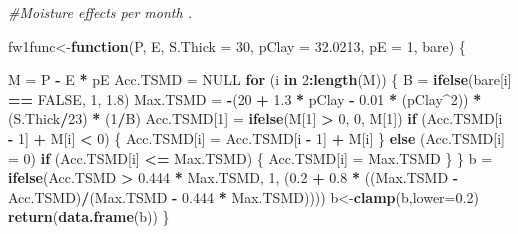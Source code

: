\documentclass[
  10pt,
  b5paper,
]{book}
\newenvironment{Shaded}{\begin{snugshade}}{\end{snugshade}}
\newcommand{\CommentTok}[1]{\textcolor[rgb]{0.56,0.35,0.01}{\textit{#1}}}
\newcommand{\ControlFlowTok}[1]{\textcolor[rgb]{0.13,0.29,0.53}{\textbf{#1}}}
\newcommand{\DataTypeTok}[1]{\textcolor[rgb]{0.13,0.29,0.53}{#1}}
\newcommand{\DecValTok}[1]{\textcolor[rgb]{0.00,0.00,0.81}{#1}}
\newcommand{\FloatTok}[1]{\textcolor[rgb]{0.00,0.00,0.81}{#1}}
\newcommand{\KeywordTok}[1]{\textcolor[rgb]{0.13,0.29,0.53}{\textbf{#1}}}
\newcommand{\NormalTok}[1]{#1}
\newcommand{\OperatorTok}[1]{\textcolor[rgb]{0.81,0.36,0.00}{\textbf{#1}}}
\newcommand{\OtherTok}[1]{\textcolor[rgb]{0.56,0.35,0.01}{#1}}
\newcommand{\StringTok}[1]{\textcolor[rgb]{0.31,0.60,0.02}{#1}}
\begin{document}
\begin{Shaded}
\begin{Highlighting}[]
\CommentTok{#Moisture effects per month . }

\NormalTok{fw1func<-}\ControlFlowTok{function}\NormalTok{(P, E, }\DataTypeTok{S.Thick =} \DecValTok{30}\NormalTok{, }\DataTypeTok{pClay =} \FloatTok{32.0213}\NormalTok{, }\DataTypeTok{pE =} \DecValTok{1}\NormalTok{, bare) }
\NormalTok{\{}
   
\NormalTok{    M =}\StringTok{ }\NormalTok{P }\OperatorTok{-}\StringTok{ }\NormalTok{E }\OperatorTok{*}\StringTok{ }\NormalTok{pE}
\NormalTok{    Acc.TSMD =}\StringTok{ }\OtherTok{NULL}
    \ControlFlowTok{for}\NormalTok{ (i }\ControlFlowTok{in} \DecValTok{2}\OperatorTok{:}\KeywordTok{length}\NormalTok{(M)) \{}
\NormalTok{ 	B =}\StringTok{ }\KeywordTok{ifelse}\NormalTok{(bare[i] }\OperatorTok{==}\StringTok{ }\OtherTok{FALSE}\NormalTok{, }\DecValTok{1}\NormalTok{, }\FloatTok{1.8}\NormalTok{)}
\NormalTok{	 Max.TSMD =}\StringTok{ }\OperatorTok{-}\NormalTok{(}\DecValTok{20} \OperatorTok{+}\StringTok{ }\FloatTok{1.3} \OperatorTok{*}\StringTok{ }\NormalTok{pClay }\OperatorTok{-}\StringTok{ }\FloatTok{0.01} \OperatorTok{*}\StringTok{ }\NormalTok{(pClay}\OperatorTok{^}\DecValTok{2}\NormalTok{)) }\OperatorTok{*}\StringTok{ }\NormalTok{(S.Thick}\OperatorTok{/}\DecValTok{23}\NormalTok{) }\OperatorTok{*}\StringTok{ }\NormalTok{(}\DecValTok{1}\OperatorTok{/}\NormalTok{B)}
\NormalTok{        Acc.TSMD[}\DecValTok{1}\NormalTok{] =}\StringTok{ }\KeywordTok{ifelse}\NormalTok{(M[}\DecValTok{1}\NormalTok{] }\OperatorTok{>}\StringTok{ }\DecValTok{0}\NormalTok{, }\DecValTok{0}\NormalTok{, M[}\DecValTok{1}\NormalTok{])}
        \ControlFlowTok{if}\NormalTok{ (Acc.TSMD[i }\OperatorTok{-}\StringTok{ }\DecValTok{1}\NormalTok{] }\OperatorTok{+}\StringTok{ }\NormalTok{M[i] }\OperatorTok{<}\StringTok{ }\DecValTok{0}\NormalTok{) \{}
\NormalTok{            Acc.TSMD[i] =}\StringTok{ }\NormalTok{Acc.TSMD[i }\OperatorTok{-}\StringTok{ }\DecValTok{1}\NormalTok{] }\OperatorTok{+}\StringTok{ }\NormalTok{M[i]}
\NormalTok{        \}}
        \ControlFlowTok{else}\NormalTok{ (Acc.TSMD[i] =}\StringTok{ }\DecValTok{0}\NormalTok{)}
        \ControlFlowTok{if}\NormalTok{ (Acc.TSMD[i] }\OperatorTok{<=}\StringTok{ }\NormalTok{Max.TSMD) \{}
\NormalTok{            Acc.TSMD[i] =}\StringTok{ }\NormalTok{Max.TSMD}
\NormalTok{        \}}
\NormalTok{    \}}
\NormalTok{    b =}\StringTok{ }\KeywordTok{ifelse}\NormalTok{(Acc.TSMD }\OperatorTok{>}\StringTok{ }\FloatTok{0.444} \OperatorTok{*}\StringTok{ }\NormalTok{Max.TSMD, }\DecValTok{1}\NormalTok{, (}\FloatTok{0.2} \OperatorTok{+}\StringTok{ }\FloatTok{0.8} \OperatorTok{*}\StringTok{ }\NormalTok{((Max.TSMD }\OperatorTok{-}\StringTok{ }
\StringTok{        }\NormalTok{Acc.TSMD)}\OperatorTok{/}\NormalTok{(Max.TSMD }\OperatorTok{-}\StringTok{ }\FloatTok{0.444} \OperatorTok{*}\StringTok{ }\NormalTok{Max.TSMD))))}
\NormalTok{	b<-}\KeywordTok{clamp}\NormalTok{(b,}\DataTypeTok{lower=}\FloatTok{0.2}\NormalTok{)}
    \KeywordTok{return}\NormalTok{(}\KeywordTok{data.frame}\NormalTok{(b))	}
\NormalTok{\}}


\end{Highlighting}
\end{Shaded}
\end{document}
